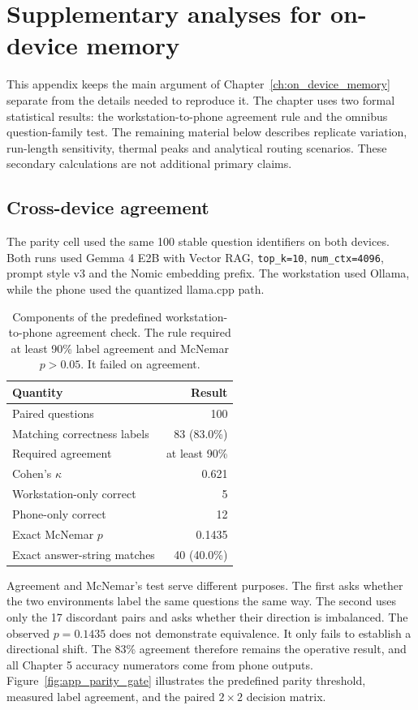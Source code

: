 
\chapter{Supplementary analyses for on-device memory}
\label{app:on_device_statistics}

This appendix keeps the main argument of Chapter~\ref{ch:on_device_memory} separate from
the details needed to reproduce it. The chapter uses two formal statistical results:
the workstation-to-phone agreement rule and the omnibus question-family test. The
remaining material below describes replicate variation, run-length sensitivity,
thermal peaks and analytical routing scenarios. These secondary calculations are not
additional primary claims.

\section{Cross-device agreement}
\label{app:ch5_parity}

The parity cell used the same 100 stable question identifiers on both devices. Both
runs used Gemma 4 E2B with Vector RAG, \texttt{top\_k=10},
\texttt{num\_ctx=4096}, prompt style v3 and the Nomic embedding prefix. The workstation
used Ollama, while the phone used the quantized llama.cpp path.

\begin{table}[htbp]
  \centering
  \small
  \begin{tabular}{lr}
    \toprule
    Quantity & Result \\
    \midrule
    Paired questions & 100 \\
    Matching correctness labels & 83 (83.0\%) \\
    Required agreement & at least 90\% \\
    Cohen's $\kappa$ & 0.621 \\
    Workstation-only correct & 5 \\
    Phone-only correct & 12 \\
    Exact McNemar $p$ & 0.1435 \\
    Exact answer-string matches & 40 (40.0\%) \\
    \bottomrule
  \end{tabular}
  \caption{Components of the predefined workstation-to-phone agreement check. The rule
  required at least 90\% label agreement and McNemar $p>0.05$. It failed on agreement.}
  \label{tab:app_ch5_parity}
\end{table}

Agreement and McNemar's test serve different purposes. The first asks whether the two
environments label the same questions the same way. The second uses only the 17
discordant pairs and asks whether their direction is imbalanced. The observed $p=0.1435$
does not demonstrate equivalence. It only fails to establish a directional shift. The
83\% agreement therefore remains the operative result, and all Chapter 5 accuracy
numerators come from phone outputs. Figure~\ref{fig:app_parity_gate} illustrates the
predefined parity threshold, measured label agreement, and the paired $2\times 2$ decision matrix.

